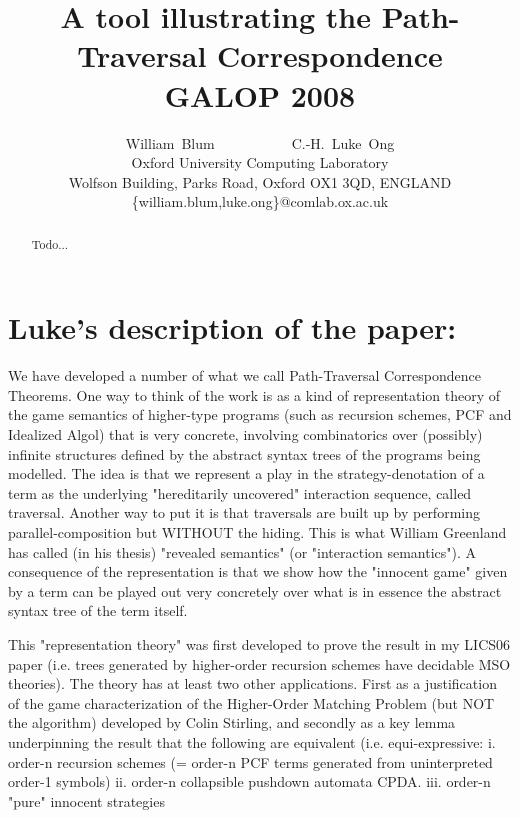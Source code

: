 


\title{A tool illustrating the Path-Traversal Correspondence
\\ GALOP 2008}

\author{William~Blum~~~~~~~~~~~C.-H.~Luke~Ong\\
Oxford University Computing Laboratory\\
Wolfson Building, Parks Road, Oxford OX1 3QD, ENGLAND\\
\{william.blum,luke.ong\}@comlab.ox.ac.uk }




\maketitle \thispagestyle{empty}

\begin{abstract}
Todo...
\end{abstract}


\section{Luke's description of the paper:}

 We have developed a number of what we call Path-Traversal
Correspondence Theorems. One way to think of the work is as a kind
of representation theory of the game semantics of higher-type
programs (such as recursion schemes, PCF and Idealized Algol) that
is very concrete, involving combinatorics over (possibly) infinite
structures defined by the abstract syntax trees of the programs
being modelled. The idea is that we represent a play in the
strategy-denotation of a term as the underlying "hereditarily
uncovered" interaction sequence, called traversal. Another way to
put it is that traversals are built up by performing
parallel-composition but WITHOUT the hiding. This is what William
Greenland has called (in his thesis) "revealed semantics" (or
"interaction semantics"). A consequence of the representation is
that we show how the "innocent game" given by a term can be played
out very concretely over what is in essence the abstract syntax tree
of the term itself.

This "representation theory" was first developed to prove the result
in my LICS06 paper (i.e. trees generated by higher-order recursion
schemes have decidable MSO theories). The theory has at least two
other applications. First as a justification of the game
characterization of the Higher-Order Matching Problem (but NOT the
algorithm) developed by Colin Stirling, and secondly as a key lemma
underpinning the result that
 the following are equivalent (i.e. equi-expressive:
i. order-n recursion schemes (= order-n PCF terms generated from
uninterpreted order-1 symbols) ii. order-n collapsible pushdown
automata CPDA. iii. order-n "pure" innocent strategies


